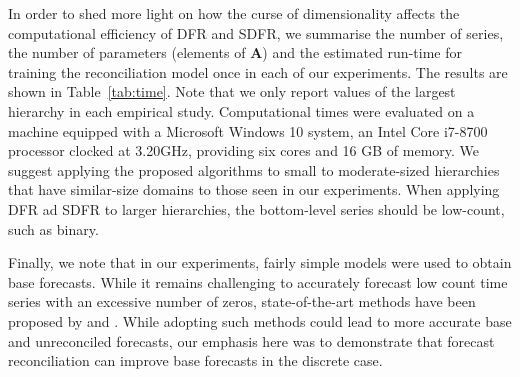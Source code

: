 \documentclass[a4paper,review,12pt,authoryear]{elsarticle}
\theoremstyle{definition}
\begin{document}
    
     In order to shed more light on how the curse of dimensionality affects the computational efficiency of DFR and SDFR, we summarise the number of series, the number of parameters (elements of $\mathbf{A}$) and the estimated run-time for training the reconciliation model once in each of our experiments. 
     The results are shown in Table~\ref{tab:time}. 
     Note that we only report values of the largest hierarchy in each empirical study. 
     Computational times were evaluated on a machine equipped with a Microsoft Windows 10 system, an Intel Core i7-8700 processor clocked at 3.20GHz, providing six cores and 16 GB of memory. We suggest applying the proposed algorithms to small to moderate-sized hierarchies that have similar-size domains to those seen in our experiments. When applying DFR ad SDFR to larger hierarchies, the bottom-level series should be low-count, such as binary. 

     \begin{table}
       \centering
       \caption{\label{tab:time} Reconciliation model size and computational time (in seconds) in the four experiments implemented in different sections.}
     \end{table}

     Finally, we note that in our experiments, fairly simple models were used to obtain base forecasts. While it remains challenging to accurately forecast low count time series with an excessive number of zeros, state-of-the-art methods have been proposed by \cite{berryBayesianForecastingMany2020a} and \cite{weissEfficientAccountingEstimation2022}. While adopting such methods could lead to more accurate base and unreconciled forecasts, our emphasis here was to demonstrate that forecast reconciliation can improve base forecasts in the discrete case.
\end{document}
